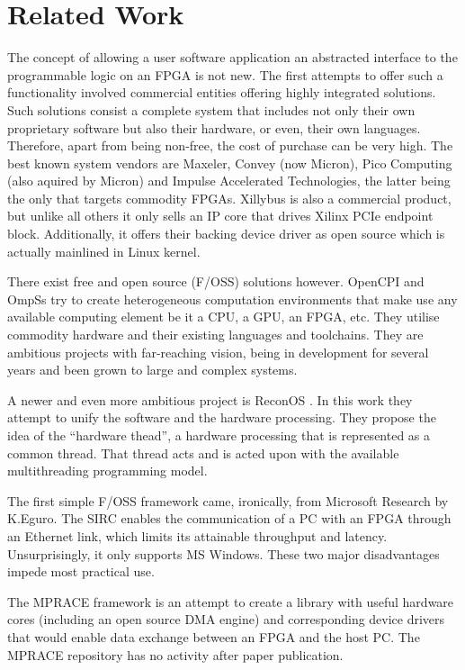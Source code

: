 \chapter{Related Work}

The concept of allowing a user software application an abstracted interface to the programmable logic on an FPGA is not new.
The first attempts to offer such a functionality involved commercial entities offering highly integrated solutions.
Such solutions consist a complete system that includes not only their own proprietary software but also their hardware,
or even, their own languages. Therefore, apart from being non-free, the cost of purchase can be very high. The best known
system vendors are Maxeler, Convey (now Micron), Pico Computing (also aquired by Micron) and Impulse Accelerated Technologies,
the latter being the only that targets commodity FPGAs. Xillybus is also a commercial product, but unlike all others it only
sells an IP core that drives Xilinx PCIe endpoint block. Additionally, it offers their backing device driver as open source
which is actually mainlined in Linux kernel.

There exist free and open source (F/OSS) solutions however. 
OpenCPI and OmpSs try to create heterogeneous computation environments
that make use any available computing element be it a CPU, a GPU, an FPGA, etc. 
They utilise commodity hardware and their existing languages and toolchains. 
They are ambitious projects with far-reaching vision, being in development for
several years and been grown to large and complex systems.

A newer and even more ambitious project is ReconOS \cite{reconos}. 
In this work they attempt to unify the software and the hardware processing.
They propose the idea of the ``hardware thead'', a hardware processing that is represented as a common thread.
That thread acts and is acted upon with the available multithreading programming model.

The first simple F/OSS framework came, ironically, from Microsoft Research by K.Eguro.
The SIRC \cite{sirc} enables the communication of a PC with an FPGA through an Ethernet link, which limits its attainable throughput
and latency.
Unsurprisingly, it only supports MS Windows. These two major disadvantages impede most practical use. 

The MPRACE \cite{mprace} framework is an attempt to create a library with useful hardware cores (including an open source DMA engine)
and corresponding device drivers that would enable data exchange between an FPGA and the host PC. 
The MPRACE repository has no activity after paper publication.

